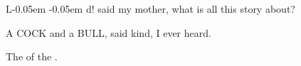 \documentclass[twoside]{article}
\begin{document}
L-\kern 0.05em -\kern 0.05em d! said my mother, what is all\break
this story about?\tsh

A {COCK} and a {BULL}, said\break
{} 
kind, I ever heard.

\vfill
\centerline{The  of the .}
\bigskip
\clearpage\hbox{}\pagestyle{empty}\clearpage\hbox{}
\end{document}
